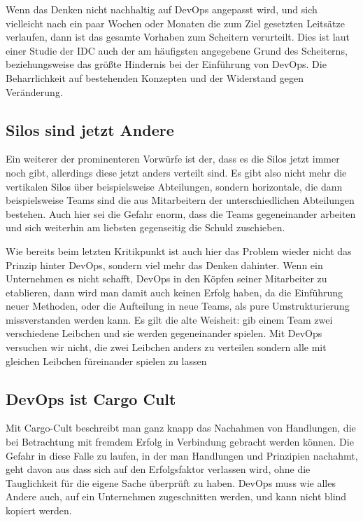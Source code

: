 Wenn das Denken nicht nachhaltig auf \ac{DevOps} angepasst wird, und sich vielleicht nach ein paar Wochen oder Monaten die zum Ziel gesetzten Leitsätze verlaufen, dann ist das gesamte Vorhaben zum Scheitern verurteilt. Dies ist laut einer Studie der \ac{IDC} \cite{idc:2020} auch der am häufigsten angegebene Grund des Scheiterns, beziehungsweise das größte Hindernis bei der Einführung von \ac{DevOps}. Die Beharrlichkeit auf bestehenden Konzepten und der Widerstand gegen Veränderung.

\subsection{Silos sind jetzt Andere}

Ein weiterer der prominenteren Vorwürfe ist der, dass es die Silos jetzt immer noch gibt, allerdings diese jetzt anders verteilt sind. Es gibt also nicht mehr die vertikalen Silos über beispielsweise Abteilungen, sondern horizontale, die dann beispielsweise Teams sind die aus Mitarbeitern der unterschiedlichen Abteilungen bestehen. Auch hier sei die Gefahr enorm, dass die Teams gegeneinander arbeiten und sich weiterhin am liebsten gegenseitig die Schuld zuschieben.

Wie bereits beim letzten Kritikpunkt ist auch hier das Problem wieder nicht das Prinzip hinter \ac{DevOps}, sondern viel mehr das Denken dahinter. Wenn ein Unternehmen es nicht schafft, \ac{DevOps} in den Köpfen seiner Mitarbeiter zu etablieren, dann wird man damit auch keinen Erfolg haben, da die Einführung neuer Methoden, oder die Aufteilung in neue Teams, als pure Umstrukturierung missverstanden werden kann. \glqq Es gilt die alte Weisheit: gib einem Team zwei verschiedene Leibchen und sie werden gegeneinander spielen. Mit DevOps versuchen wir nicht, die zwei Leibchen anders zu verteilen sondern alle mit gleichen Leibchen füreinander spielen zu lassen\grqq \cite{halstenberg:2020}

\subsection{DevOps ist Cargo Cult}

Mit Cargo-Cult beschreibt man ganz knapp das Nachahmen von Handlungen, die bei Betrachtung mit fremdem Erfolg in Verbindung gebracht werden können. Die Gefahr in diese Falle zu laufen, in der man Handlungen und Prinzipien nachahmt, geht davon aus dass sich auf den Erfolgsfaktor verlassen wird, ohne die Tauglichkeit für die eigene Sache überprüft zu haben. \ac{DevOps} muss wie alles Andere auch, auf ein Unternehmen zugeschnitten werden, und kann nicht blind kopiert werden.

